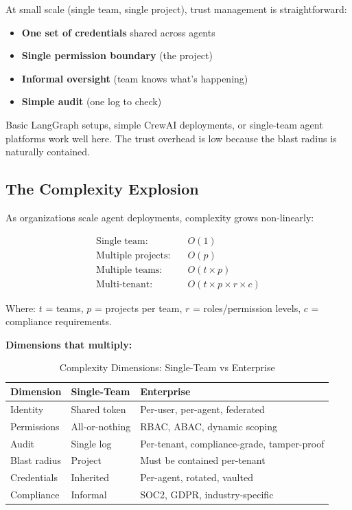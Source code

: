 At small scale (single team, single project), trust management is straightforward:

\begin{itemize}
    \item \textbf{One set of credentials} shared across agents
    \item \textbf{Single permission boundary} (the project)
    \item \textbf{Informal oversight} (team knows what's happening)
    \item \textbf{Simple audit} (one log to check)
\end{itemize}

Basic LangGraph setups, simple CrewAI deployments, or single-team agent platforms work well here. The trust overhead is low because the blast radius is naturally contained.

\subsection{The Complexity Explosion}
\label{subsec:complexity-explosion}

As organizations scale agent deployments, complexity grows non-linearly:

\begin{align}
\text{Single team:} &\quad O(1) \\
\text{Multiple projects:} &\quad O(p) \\
\text{Multiple teams:} &\quad O(t \times p) \\
\text{Multi-tenant:} &\quad O(t \times p \times r \times c)
\end{align}

Where: $t$ = teams, $p$ = projects per team, $r$ = roles/permission levels, $c$ = compliance requirements.

\textbf{Dimensions that multiply:}

\begin{table}[htbp]
\centering
\caption{Complexity Dimensions: Single-Team vs Enterprise}
\label{tab:complexity-dimensions}
\begin{tabular}{lll}
\toprule
\textbf{Dimension} & \textbf{Single-Team} & \textbf{Enterprise} \\
\midrule
Identity & Shared token & Per-user, per-agent, federated \\
Permissions & All-or-nothing & RBAC, ABAC, dynamic scoping \\
Audit & Single log & Per-tenant, compliance-grade, tamper-proof \\
Blast radius & Project & Must be contained per-tenant \\
Credentials & Inherited & Per-agent, rotated, vaulted \\
Compliance & Informal & SOC2, GDPR, industry-specific \\
\bottomrule
\end{tabular}
\end{table}

